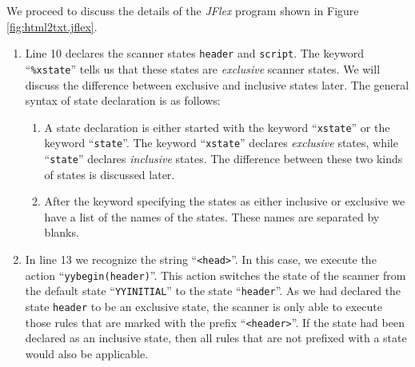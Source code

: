 We proceed to discuss the details of the \textsl{JFlex} program shown in Figure \ref{fig:html2txt.jflex}.
\begin{enumerate}
\item Line  10 declares the scanner states \texttt{header} and \texttt{script}.  The keyword ``\texttt{\%xstate}''
      tells us that these states are  \emph{exclusive} scanner states.  We will discuss the difference
      between exclusive and inclusive states later.
      The general syntax of state declaration is as follows:
      \begin{enumerate}
      \item A state declaration is either started with the keyword ``\texttt{xstate}''
            or the keyword ``\texttt{state}''.  The keyword
            ``\texttt{xstate}'' declares \emph{exclusive} states, while
            ``\texttt{state}'' declares  \emph{inclusive} states.  The 
            difference between these two kinds of states is discussed later.
      \item After the keyword specifying the states as either inclusive or exclusive we have a list
            of the names of the states.  These names are separated by blanks.
      \end{enumerate}
\item In line 13 we recognize the string  ``\texttt{<head>}''.  In this case, we execute the action 
      ``\texttt{yybegin(header)}''.  This action switches the state of the scanner from the default
      state ``\texttt{YYINITIAL}'' to  the state ``\texttt{header}''.   
      As we had declared the state \texttt{header} to be an  exclusive state, the scanner is only
      able to execute those rules that are marked with the prefix ``\texttt{<header>}''.
      If the state had been declared as an inclusive state, then all rules that are not prefixed
      with a state would also be applicable.  
      

\end{enumerate}

